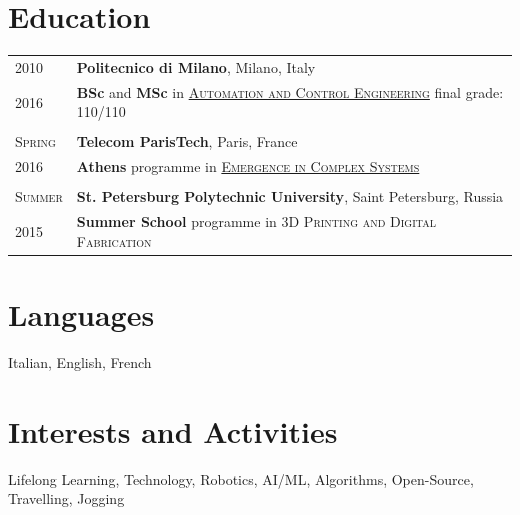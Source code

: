 \documentclass[a4paper,10pt]{article}
\begin{document}
	\section{Education}
		\begin{tabular}{p{1.7cm}|p{15.5cm}}
			\centering\textsc{2010} & \textbf{Politecnico di Milano}, Milano, Italy\\
			\centering\textsc{2016} & \textbf{BSc} and \textbf{MSc} in \textsc{\href{http://www.polinternational.polimi.it/educational-offer/laurea-magistrale-equivalent-to-master-of-science-programmes/automation-and-control-engineering/}{Automation and Control Engineering}} \hfill final grade: \textsc{110/110} \\ 
			
			\multicolumn{2}{c}{} \\
			\centering\textsc{Spring} & \textbf{Telecom ParisTech}, Paris, France\\
			\centering\textsc{2016}   &  \textbf{Athens} programme in \textsc{\href{http://www.athensprogramme.com/catalog/show/1640}{Emergence in Complex Systems}}\\
			
			\multicolumn{2}{c}{} \\
			\centering\textsc{Summer} & \textbf{St. Petersburg Polytechnic University}, Saint Petersburg, Russia\\
			\centering\textsc{2015}      & \textbf{Summer School} programme in \textsc{3D Printing and Digital Fabrication}\\
		\end{tabular}

	\section{Languages}
	Italian, English, French

	\section{Interests and Activities}
	Lifelong Learning, Technology, Robotics, AI/ML, Algorithms, Open-Source, Travelling, Jogging\\
\end{document}
